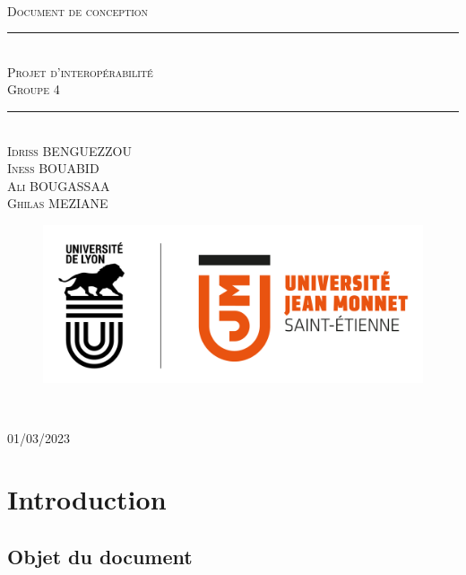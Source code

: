 \documentclass[a4paper, 12pt]{article}
\newcommand{\HRule}{\rule{\linewidth}{0.5mm}}
\begin{document}
\begin{titlepage}
  \begin{sffamily}
  \begin{center}

   
  \textsc{\LARGE }\\[2cm]

    \textsc{\Large Document de conception}

    \HRule \\[0.4cm]
    { \huge  \textsc{Projet d'interopérabilité} \\
    \textsc{\small Groupe 4}\\ [0.4cm] }
	

    \HRule \\[2cm]
    \textsc {Idriss BENGUEZZOU\\ Iness BOUABID\\Ali BOUGASSAA\\Ghilas MEZIANE }
 \begin{figure}
     \centering
    \includegraphics[scale=0.2]{logoUJM.png}
     \label{fig:ujm_logo}
 \end{figure}
   
    \

    \vfill

    {\large {} 01/03/2023}

  \end{center}
  \end{sffamily}
\end{titlepage}


\newpage
\tableofcontents

\newpage

\section{Introduction}
    \subsection{Objet du document}
    
\end{document}
